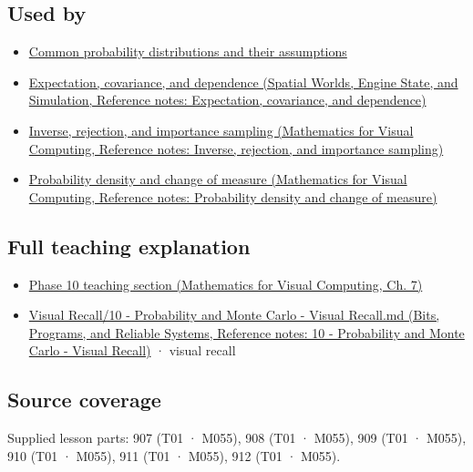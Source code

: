 \subsection{Used by}\label{appendix-4d0203f7944f-used-by}

\hypertarget{appendix-4d0203f7944f-used-by}{}

\begin{itemize}
\tightlist
\item
  \hyperref[appendix-a2360b435383]{Common probability distributions and their assumptions}
\item
  \href{../05-Spatial-Worlds-Engine-State-and-Simulation/main.pdf\#nameddest=appendix-54c383df9992}{Expectation, covariance, and dependence (Spatial Worlds, Engine State, and Simulation, Reference notes: Expectation, covariance, and dependence)}
\item
  \href{../02-Mathematics-for-Visual-Computing/main.pdf\#nameddest=appendix-8d863ed954d0}{Inverse, rejection, and importance sampling (Mathematics for Visual Computing, Reference notes: Inverse, rejection, and importance sampling)}
\item
  \href{../02-Mathematics-for-Visual-Computing/main.pdf\#nameddest=appendix-4815cd87ab8b}{Probability density and change of measure (Mathematics for Visual Computing, Reference notes: Probability density and change of measure)}
\end{itemize}

\subsection{Full teaching explanation}\label{appendix-4d0203f7944f-full-teaching-explanation}

\hypertarget{appendix-4d0203f7944f-full-teaching-explanation}{}

\begin{itemize}
\tightlist
\item
  \href{../02-Mathematics-for-Visual-Computing/main.pdf\#nameddest=02-foundations-ii-ch023-random-quantities-and-their-probability-laws}{Phase 10 teaching section (Mathematics for Visual Computing, Ch. 7)}
\item
  \href{../01-Bits-Programs-and-Reliable-Systems/main.pdf\#nameddest=appendix-cb5af353ef77}{Visual Recall/10 - Probability and Monte Carlo - Visual Recall.md (Bits, Programs, and Reliable Systems, Reference notes: 10 - Probability and Monte Carlo - Visual Recall)} · visual recall
\end{itemize}

\subsection{Source coverage}\label{appendix-4d0203f7944f-source-coverage}

\hypertarget{appendix-4d0203f7944f-source-coverage}{}

Supplied lesson parts: 907 (T01 · M055), 908 (T01 · M055), 909 (T01 · M055), 910 (T01 · M055), 911 (T01 · M055), 912 (T01 · M055).
